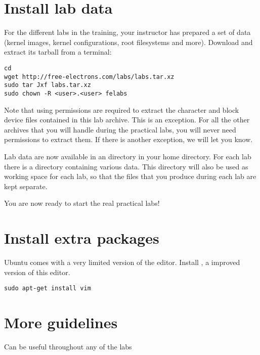 
\section{Install lab data}

For the different labs in the training, your instructor has prepared a
set of data (kernel images, kernel configurations, root filesystems
and more). Download and extract its tarball from a terminal:

\begin{verbatim}
cd
wget http://free-electrons.com/labs/labs.tar.xz
sudo tar Jxf labs.tar.xz
sudo chown -R <user>.<user> felabs
\end{verbatim}

Note that using  permissions are required to extract the
character and block device files contained in this lab archive. This is
an exception. For all the other archives that you will handle during 
the practical labs, you will never need  permissions to
extract them. If there is another exception, we will let you know.

Lab data are now available in an  directory in your home
directory. For each lab there is a directory containing various
data. This directory will also be used as working space for each lab,
so that the files that you produce during each lab are kept separate.

You are now ready to start the real practical labs!

\section{Install extra packages}

Ubuntu comes with a very limited version of the 
editor. Install , a improved version of this editor.

\begin{verbatim}
sudo apt-get install vim
\end{verbatim}

\section{More guidelines}

Can be useful throughout any of the labs

